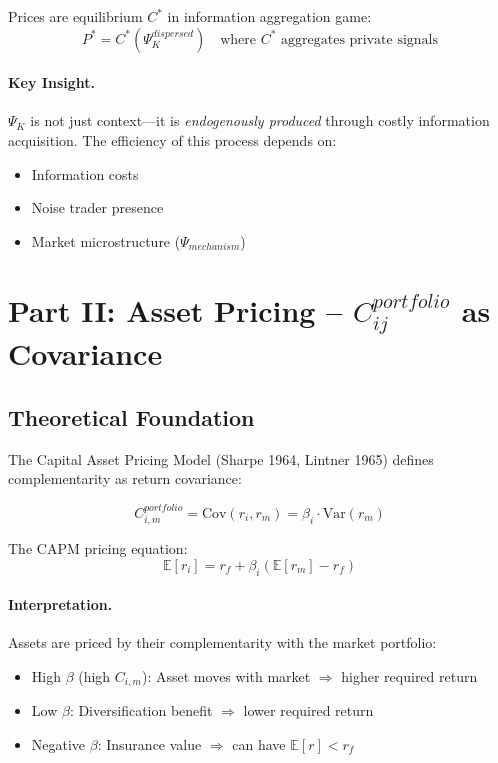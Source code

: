 Prices are equilibrium $C^*$ in information aggregation game:
\begin{equation}
P^* = C^*(\Psi_K^{dispersed}) \quad \text{where } C^* \text{ aggregates private signals}
\end{equation}

\paragraph{Key Insight.}
$\Psi_K$ is not just context---it is \textit{endogenously produced} through
costly information acquisition. The efficiency of this process depends on:
\begin{itemize}
    \item Information costs
    \item Noise trader presence
    \item Market microstructure ($\Psi_{mechanism}$)
\end{itemize}


\section{Part II: Asset Pricing -- $C_{ij}^{portfolio}$ as Covariance}
\label{sec:Y-asset-pricing}

\subsection{Theoretical Foundation}

The Capital Asset Pricing Model (Sharpe 1964, Lintner 1965) defines
complementarity as return covariance:

\begin{equation}
\boxed{
C_{i,m}^{portfolio} = \text{Cov}(r_i, r_m) = \beta_i \cdot \text{Var}(r_m)
}
\label{eq:capm-beta}
\end{equation}

The CAPM pricing equation:
\begin{equation}
\mathbb{E}[r_i] = r_f + \beta_i (\mathbb{E}[r_m] - r_f)
\end{equation}

\paragraph{Interpretation.}
Assets are priced by their complementarity with the market portfolio:
\begin{itemize}
    \item High $\beta$ (high $C_{i,m}$): Asset moves with market $\Rightarrow$ higher required return
    \item Low $\beta$: Diversification benefit $\Rightarrow$ lower required return
    \item Negative $\beta$: Insurance value $\Rightarrow$ can have $\mathbb{E}[r] < r_f$
\end{itemize}


